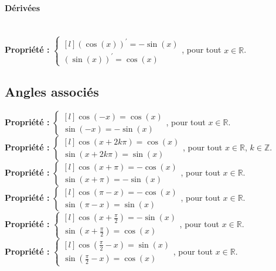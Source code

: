 \documentclass[a4paper,titlepage]{article}
\begin{document}
            \paragraph{Dérivées}\mbox{}\\
                \textbf{Propriété :} $\left\{\begin{smallmatrix*}[l]\left(\cos\left(x\right)\right)^{\prime}=-\sin\left(x\right)\\\left(\sin\left(x\right)\right)^{\prime}=\cos\left(x\right)\end{smallmatrix*}\!\right.$, pour tout $x\in\mathbb{R}$.
    \subsection{Angles associés}
        \textbf{Propriété :} $\left\{\begin{smallmatrix*}[l]\cos\left(-x\right)=\cos\left(x\right)\\\sin\left(-x\right)=-\sin\left(x\right)\end{smallmatrix*}\!\right.$, pour tout $x\in\mathbb{R}$.
        \\
        \textbf{Propriété :} $\left\{\begin{smallmatrix*}[l]\cos\left(x+2k\pi\right)=\cos\left(x\right)\\\sin\left(x+2k\pi\right)=\sin\left(x\right)\end{smallmatrix*}\!\right.$, pour tout $x\in\mathbb{R}$, $k\in\mathbb{Z}$.
        \\
        \textbf{Propriété :} $\left\{\begin{smallmatrix*}[l]\cos\left(x+\pi\right)=-\cos\left(x\right)\\\sin\left(x+\pi\right)=-\sin\left(x\right)\end{smallmatrix*}\!\right.$, pour tout $x\in\mathbb{R}$.
        \\
        \textbf{Propriété :} $\left\{\begin{smallmatrix*}[l]\cos\left(\pi-x\right)=-\cos\left(x\right)\\\sin\left(\pi-x\right)=\sin\left(x\right)\end{smallmatrix*}\!\right.$, pour tout $x\in\mathbb{R}$.
        \\
        \textbf{Propriété :} $\left\{\begin{smallmatrix*}[l]\cos\left(x+\frac{\pi}{2}\right)=-\sin\left(x\right)\\\sin\left(x+\frac{\pi}{2}\right)=\cos\left(x\right)\end{smallmatrix*}\!\right.$, pour tout $x\in\mathbb{R}$.
        \\
        \textbf{Propriété :} $\left\{\begin{smallmatrix*}[l]\cos\left(\frac{\pi}{2}-x\right)=\sin\left(x\right)\\\sin\left(\frac{\pi}{2}-x\right)=\cos\left(x\right)\end{smallmatrix*}\!\right.$, pour tout $x\in\mathbb{R}$.
\end{document}
